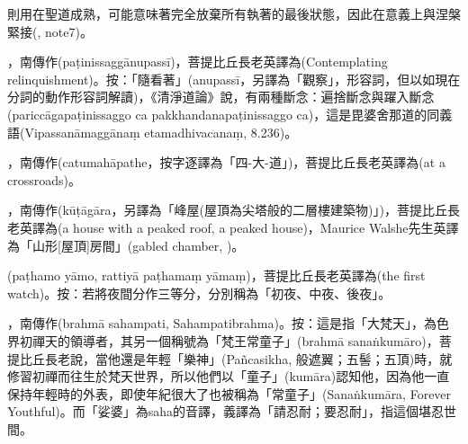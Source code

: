 \startitemgroup[noteitems]
\item{}則用在聖道成熟，可能意味著完全放棄所有執著的最後狀態，因此在意義上與涅槃緊接(, note7)。
\item{}，南傳作(paṭinissaggānupassī)，菩提比丘長老英譯為(Contemplating relinquishment)。按：「隨看著」(anupassī，另譯為「觀察」，形容詞，但以如現在分詞的動作形容詞解讀)，《清淨道論》說，有兩種斷念：遍捨斷念與躍入斷念(pariccāgapaṭinissaggo ca pakkhandanapaṭinissaggo ca)，這是毘婆舍那道的同義語(Vipassanāmaggānaṃ etamadhivacanaṃ, 8.236)。
\stopitemgroup

\startitemgroup[noteitems]
\item{}，南傳作(catumahāpathe，按字逐譯為「四-大-道」)，菩提比丘長老英譯為(at a crossroads)。
\stopitemgroup

\startitemgroup[noteitems]
\item{}，南傳作(kūṭāgāra，另譯為「峰屋(屋頂為尖塔般的二層樓建築物)」)，菩提比丘長老英譯為(a house with a peaked roof, a peaked house)，Maurice Walshe先生英譯為「山形[屋頂]房間」(gabled chamber, )。
\stopitemgroup

\startitemgroup[noteitems]
\item{}(paṭhamo yāmo, rattiyā paṭhamaṃ yāmaṃ)，菩提比丘長老英譯為(the first watch)。按：若將夜間分作三等分，分別稱為「初夜、中夜、後夜」。
\stopitemgroup

\startitemgroup[noteitems]
\item{}，南傳作(brahmā sahampati, Sahampatibrahma)。按：這是指「大梵天」，為色界初禪天的領導者，其另一個稱號為「梵王常童子」(brahmā sanaṅkumāro)，菩提比丘長老說，當他還是年輕「樂神」(Pañcasikha, 般遮翼；五髻；五頂)時，就修習初禪而往生於梵天世界，所以他們以「童子」(kumāra)認知他，因為他一直保持年輕時的外表，即使年紀很大了也被稱為「常童子」(Sanaṅkumāra, Forever Youthful)。而「娑婆」為saha的音譯，義譯為「請忍耐；要忍耐」，指這個堪忍世間。
\stopitemgroup


